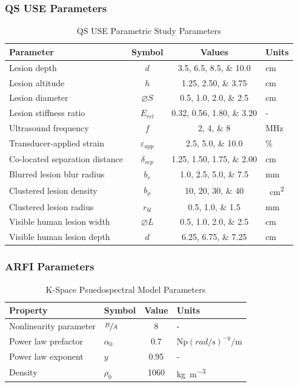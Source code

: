\documentclass{beamer}
\newcommand{\percent}{\%}
\begin{document}
		\begin{frame}[label=qsParameters]
			\frametitle{QS USE Parameters}
			\centering
			\scriptsize
			\begin{table}
				\caption{QS USE Parametric Study Parameters}
				\begin{tabular}{lccs[table-unit-alignment = left]}
					\toprule
					Parameter & Symbol & Values & Units \\
					\midrule
					Lesion depth & $d$ & \numlist{3.5;6.5;8.5;10.0} & \si{\cm} \\
					Lesion altitude & $h$ & \numlist{1.25;2.50;3.75} & \si{\cm} \\
					Lesion diameter & $\diameter S$ & \numlist{0.5;1.0;2.0;2.5} & \si{\cm} \\
					Lesion stiffness ratio & $E_{rel}$ & \numlist{0.32;0.56;1.80;3.20} & - \\
					Ultrasound frequency & $f$ & \numlist{2;4;8} & \si{\MHz} \\
					Transducer-applied strain & $\varepsilon_{app}$ & \numlist{2.5;5.0;10.0} & \si{\percent} \\
					Co-located separation distance & $\delta_{sep}$ & \numlist{1.25;1.50;1.75;2.00} & \si{\cm} \\
					Blurred lesion blur radius & $b_r$ & \numlist{1.0;2.5;5.0;7.5} & \si{\mm} \\
					Clustered lesion density & $b_\rho$ & \numlist{10;20;30;40} & \si{\per\cm\squared} \\
					Clustered lesion radius & $r_{bl}$ & \numlist{0.5;1.0;1.5} & \si{\mm} \\
					Visible human lesion width & $\diameter L$ & \numlist{0.5;1.0;2.0;2.5} & \si{\cm} \\
					Visible human lesion depth & $d$ & \numlist{6.25;6.75;7.25} & \si{\cm} \\
					\bottomrule
				\end{tabular}
			\end{table}
		\end{frame}

		\begin{frame}[allowframebreaks,label=arfiParameters]
			\frametitle{ARFI Parameters}
			\centering
			\scriptsize
			\begin{table}
				\caption{K-Space Psuedospectral Model Parameters}
				\begin{tabular}{llSs[table-unit-alignment = left]}
					\toprule
					Property & Symbol & {Value} & Units \\
					\midrule
					Nonlinearity parameter & $\sfrac{B}{A}$ & 8 & - \\
					Power law prefactor & $\alpha_0$ & 0.7 & $\si{\neper} \left(\si{rad\per\s}\right)^{-y} \si{\per\m}$ \\
					Power law exponent & $y$ & 0.95 & - \\
					Density & $\rho_0$ & 1060 & \si{\kg\per\m\cubed} \\
					\bottomrule
				\end{tabular}
			\end{table}
		\end{frame}
\end{document}
